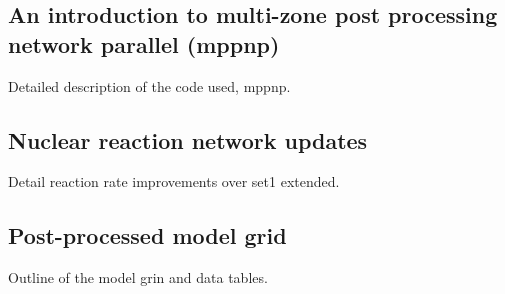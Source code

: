 \subsection{An introduction to multi-zone post processing network parallel (mppnp)}

Detailed description of the code used, mppnp.

\subsection{Nuclear reaction network updates}

Detail reaction rate improvements over set1 extended.

\subsection{Post-processed model grid}

Outline of the model grin and data tables.